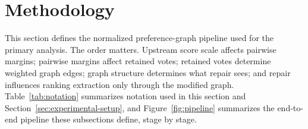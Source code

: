 \documentclass[manuscript,anonymous,review]{acmart}
\begin{document}
\section{Methodology}
\label{sec:methodology}

This section defines the normalized preference-graph pipeline used for the
primary analysis. The order matters. Upstream score scale affects
pairwise margins; pairwise margins affect retained votes; retained votes
determine weighted graph edges; graph structure determines what repair sees;
and repair influences ranking extraction only through the modified graph.
Table~\ref{tab:notation} summarizes notation used in this section and
Section~\ref{sec:experimental-setup}, and Figure~\ref{fig:pipeline} summarizes
the end-to-end pipeline these subsections define, stage by stage.
\end{document}

